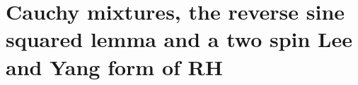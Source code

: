 \chapter{Cauchy mixtures, the reverse sine squared lemma and a two spin Lee and Yang form of RH}\label{vol1:ch21}

